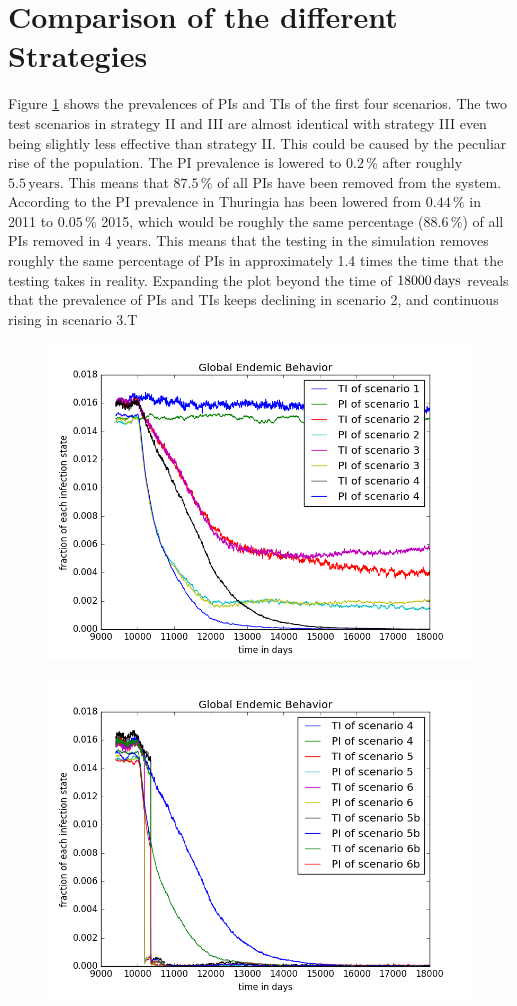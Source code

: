 \section{Comparison of the different Strategies}\label{chap:stratComparison}
Figure \ref{fig:contComp1} shows the prevalences of PIs and TIs of the first four scenarios. The two test scenarios in strategy II and III are almost identical with strategy III even being slightly less effective than strategy II. This could be caused by the peculiar rise of the population. The PI prevalence is lowered to $0.2\,\%$ after roughly $5.5\,\text{years}$. This means that $87.5\,\%$ of all PIs have been removed from the system. According to \citep{personalCom} the PI prevalence in Thuringia has been lowered from $0.44\,\%$ in 2011 to $0.05\,\%$ 2015, which would be roughly the same percentage ($88.6\,\%$) of all PIs removed in 4 years. This means that the testing in the simulation removes roughly the same percentage of PIs in approximately 1.4 times the time that the testing takes in reality. Expanding the plot beyond the time of $18000\,\text{days}$ reveals that the prevalence of PIs and TIs keeps declining in scenario 2, and continuous rising in scenario 3.T
\begin{figure}[htbp]
\centering
\noindent\includegraphics[width=0.8\linewidth,height=\textheight,
keepaspectratio]{comp1b4endemicFractions.png} 
\caption[Comparison of Prevalences for the Strategies I-IV]{}
\label{fig:contComp1}
\end{figure}
\begin{figure}[htbp]
\centering
\noindent\includegraphics[width=0.8\linewidth,height=\textheight,
keepaspectratio]{comp4t6bendemicFractions.png} 
\caption[Comparison of Prevalences for the Strategies IV-VIb]{}
\label{fig:contComp2}
\end{figure}